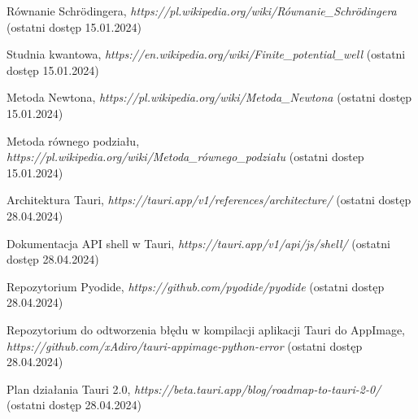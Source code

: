 \documentclass{SGGW-thesis}
\begin{document}
\begin{thebibliography}{9}
	Równanie Schrödingera, 
	\textit{https://pl.wikipedia.org/wiki/Równanie\_Schrödingera}
	(ostatni dostęp 15.01.2024)
	
	Studnia kwantowa, 
	\textit{https://en.wikipedia.org/wiki/Finite\_potential\_well}
	(ostatni dostęp 15.01.2024)
	
	Metoda Newtona, 
	\textit{https://pl.wikipedia.org/wiki/Metoda\_Newtona}
	(ostatni dostęp 15.01.2024) 
	
	Metoda równego podziału, 
	\textit{https://pl.wikipedia.org/wiki/Metoda\_równego\_podziału}
	(ostatni dostep 15.01.2024)
	
	Architektura Tauri, 
	\textit{https://tauri.app/v1/references/architecture/}
	(ostatni dostęp 28.04.2024)
	
	Dokumentacja API shell w Tauri, 
	\textit{https://tauri.app/v1/api/js/shell/}
	(ostatni dostęp 28.04.2024)
	

	
	Repozytorium Pyodide, 
	\textit{https://github.com/pyodide/pyodide}
	(ostatni dostęp 28.04.2024)
	
	Repozytorium do odtworzenia błędu w kompilacji aplikacji Tauri do AppImage, 
	\textit{https://github.com/xAdiro/tauri-appimage-python-error}
	(ostatni dostęp 28.04.2024)
	
	Plan działania Tauri 2.0, 
	\textit{https://beta.tauri.app/blog/roadmap-to-tauri-2-0/}
	(ostatni dostęp 28.04.2024)
	
	
	
	
	
	
	
	
	
\end{thebibliography}

\beforelastpage
\end{document}

